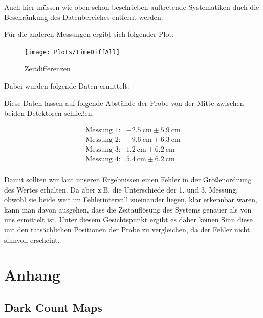 \documentclass[12pt,twoside,a4paper]{scrartcl}
\begin{document}
					 Auch hier müssen wie oben schon beschrieben auftretende Systematiken duch die Beschränkung des Datenbereiches entfernt werden.

					 Für die anderen Messungen ergibt sich folgender Plot:

					 \begin{figure}[H]
						 \centering
						 \texttt{[image: Plots/timeDiffAll]}
					 	\caption{Zeitdifferenzen}
					 \end{figure}

					 Dabei wurden folgende Daten ermittelt:

					 

					 Diese Daten lassen auf folgende Abstände der Probe von der Mitte zwischen beiden Detektoren schließen:

					 \begin{align*}
					 	\text{Messung 1:}& \SI{-2.5}{\centi \metre} \pm \SI{5.9}{\centi \metre} \\
						\text{Messung 2:}& \SI{-9.6}{\centi \metre} \pm \SI{6.3}{\centi \metre} \\
						\text{Messung 3:}& \SI{1.2}{\centi \metre} \pm \SI{6.2}{\centi \metre} \\
						\text{Messung 4:}& \SI{5.4}{\centi \metre} \pm \SI{6.2}{\centi \metre} \\
					 \end{align*}

					 Damit sollten wir laut unseren Ergebnissen einen Fehler in der Größenordnung des Wertes erhalten. Da aber z.B. die Unterschiede der 1. und 3. Messung, obwohl sie beide weit im Fehlerintervall zueinander liegen, klar erkennbar waren, kann man davon ausgehen, dass die Zeitauflösung des Systems genauer als von uns ermittelt ist. Unter diesem Gesichtspunkt ergibt es daher keinen Sinn diese mit den tatsächlichen Positionen der Probe zu vergleichen, da der Fehler nicht sinnvoll erscheint.

		\newpage


		\section{Anhang}
		\label{Anhang}
			\subsection{Dark Count Maps}
\end{document}
